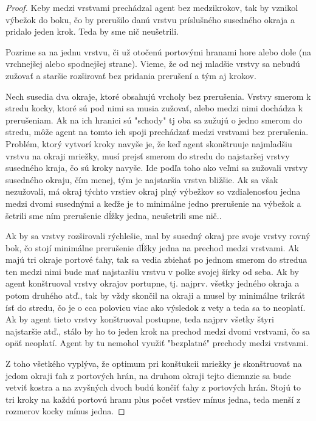 \begin{proof}
Keby medzi vrstvami prechádzal agent bez medzikrokov, tak by vznikol výbežok
do boku, čo by prerušilo danú vrstvu príslušného susedného okraja a pridalo
jeden krok. Teda by sme nič neušetrili.

Pozrime sa na jednu vrstvu, či už otočenú portovými hranami hore alebo dole
(na vrchnejšej alebo spodnejšej strane). Vieme, že od nej mladšie vrstvy sa
nebudú zužovať a staršie rozširovať bez pridania prerušení a tým aj krokov.

Nech susedia dva okraje, ktoré obsahujú vrcholy bez prerušenia. Vrstvy
smerom k stredu kocky, ktoré sú pod nimi sa musia zužovať, alebo medzi nimi
dochádza k prerušeniam. Ak na ich hranici sú "schody" tj oba sa zužujú o
jedno smerom do stredu, môže agent na tomto ich spoji prechádzať medzi
vrstvami bez prerušenia. Problém, ktorý vytvorí kroky navyše je, že keď
agent skonštruuje najmladšiu vrstvu na okraji mriežky, musí prejsť smerom do
stredu do najstaršej vrstvy susedného kraja, čo sú kroky navyše. Ide podľa
toho ako veľmi sa zužovali vrstvy susedného okraju, čím menej, tým je
najstaršia vrstva bližšie. Ak sa však nezužovali, má okraj týchto vrstiev
okraj plný výbežkov so vzdialenosťou jedna medzi dvomi susednými a keďže je
to minimálne jedno prerušenie na výbežok a šetrili sme ním prerušenie dĺžky
jedna, neušetrili sme nič..

Ak by sa vrstvy rozširovali rýchlešie, mal by susedný okraj pre svoje  vrstvy
rovný bok, čo stojí minimálne prerušenie dĺžky jedna na prechod medzi
vrstvami. Ak majú tri okraje portové ťahy, tak sa vedia zbiehať po jednom
smerom do stredua ten medzi nimi bude mať najstaršiu vrstvu v polke svojej
šírky od seba. Ak by agent konštruoval vrstvy okrajov portupne, tj. najprv.
všetky jedného okraja a potom druhého atď., tak by vždy skončil na okraji a
musel by minimálne trikrát ísť do stredu, čo je o cca polovicu viac ako
výsledok z vety a teda sa to neoplatí. Ak by agent tieto vrstvy konštruoval
postupne, teda najprv všetky štyri najstaršie atď., stálo by ho to jeden
krok na prechod medzi dvomi vrstvami, čo sa opäť neoplatí. Agent by tu
nemohol využiť "bezplatné" prechody medzi vrstvami.

Z toho všetkého vyplýva, že optimum pri konštukcii mriežky je skonštruovať
na jedom okraji ťah z portových hrán, na druhom okraji tejto diemnzie sa
bude vetviť kostra a na zvyšných dvoch budú končiť ťahy z portových hrán.
Stojú to tri kroky na každú portovú hranu plus počet vrstiev mínus jedna,
teda menší z rozmerov kocky mínus jedna.
\end{proof}
\fi


